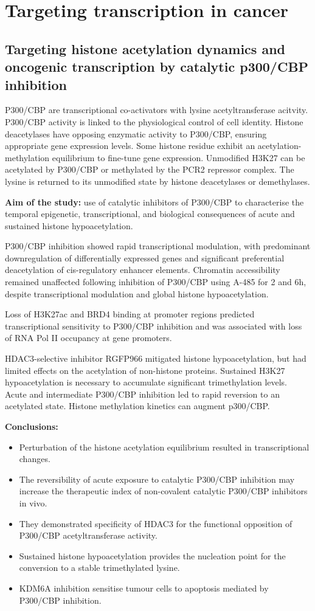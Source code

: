 \section{Targeting transcription in cancer}
\subsection{Targeting histone acetylation dynamics and oncogenic transcription by catalytic p300/CBP inhibition}
P300/CBP are transcriptional co-activators with lysine acetyltransferase acitvity.  P300/CBP activity is linked to the physiological control of cell identity. Histone deacetylases have opposing enzymatic activity to P300/CBP, ensuring appropriate gene expression levels.
Some histone residue exhibit an acetylation-methylation equilibrium to fine-tune gene expression.
Unmodified H3K27 can be acetylated by P300/CBP or methylated by the PCR2 repressor complex. The lysine is returned to its unmodified state by histone deacetylases or demethylases.

\textbf{Aim of the study:} use of catalytic inhibitors of P300/CBP to characterise the temporal epigenetic, transcriptional, and biological consequences of acute and sustained histone hypoacetylation.

P300/CBP inhibition showed rapid transcriptional modulation, with predominant downregulation of differentially expressed genes and significant preferential deacetylation of cis-regulatory enhancer elements. Chromatin accessibility remained unaffected following inhibition of P300/CBP using A-485 for 2 and 6h, despite transcriptional modulation and global histone hypoacetylation. 

Loss of H3K27ac and BRD4 binding at promoter regions predicted transcriptional sensitivity to P300/CBP inhibition and was associated with loss of RNA Pol II occupancy at gene promoters.

HDAC3-selective inhibitor RGFP966 mitigated histone hypoacetylation, but had limited effects on the acetylation of non-histone proteins.
Sustained H3K27 hypoacetylation is necessary to accumulate significant trimethylation levels. Acute and intermediate P300/CBP inhibition led to rapid reversion to an acetylated state. Histone methylation kinetics can augment p300/CBP.

\textbf{Conclusions:}
\begin{itemize}
\tightlist
\item Perturbation of the histone acetylation equilibrium resulted in transcriptional changes.
\item The reversibility of acute exposure to catalytic P300/CBP inhibition may increase the therapeutic index of non-covalent catalytic P300/CBP inhibitors in vivo.
\item They demonstrated specificity of HDAC3 for the functional opposition of P300/CBP acetyltransferase activity.
\item Sustained histone hypoacetylation provides the nucleation point for the conversion to a stable trimethylated lysine.
\item KDM6A inhibition sensitise tumour cells to apoptosis mediated by P300/CBP inhibition.
\end{itemize}

